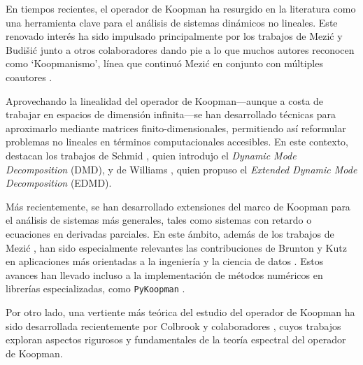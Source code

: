 En tiempos recientes, el operador de Koopman ha resurgido en la literatura como una herramienta clave para el análisis de sistemas dinámicos no lineales. Este renovado interés ha sido impulsado principalmente por los trabajos de Mezić y Budišić junto a otros colaboradores \cite{Budisic2009AnObservables, Budisic2012GeometryFlows, Budisic2012AppliedKoopmanism} dando pie a lo que muchos autores reconocen como `Koopmanismo', línea que continuó Mezić en conjunto con múltiples coautores \cite{Rowley2009SpectralFlows, Susuki2011NonlinearDynamics, Mezic2013AnalysisOperator, Mauroy2013IsostablesDynamics, Lan2013LinearizationSpectrum, Korda2018OnOperator, Korda2018LinearControl, Arbabi2017ErgodicOperator, Arbabi2017StudyDecomposition, Mauroy2020TheControl, Korda2020OptimalControl, Korda2020Data-drivenOperator, Mezic2020SpectrumGeometry, Mezic2022OnOperator, Mezic2024ACases}.  

Aprovechando la linealidad del operador de Koopman—aunque a costa de trabajar en espacios de dimensión infinita—se han desarrollado técnicas para aproximarlo mediante matrices finito-dimensionales, permitiendo así reformular problemas no lineales en términos computacionales accesibles. En este contexto, destacan los trabajos de Schmid \cite{Schmid2008DynamicData}, quien introdujo el \textit{Dynamic Mode Decomposition} (DMD), y de Williams \cite{Williams2015ADecomposition}, quien propuso el \textit{Extended Dynamic Mode Decomposition} (EDMD).  

Más recientemente, se han desarrollado extensiones del marco de Koopman para el análisis de sistemas más generales, tales como sistemas con retardo o ecuaciones en derivadas parciales. En este ámbito, además de los trabajos de Mezić \cite{Mezic2013AnalysisOperator, Mezic2020SpectrumGeometry, Mezic2022OnOperator}, han sido especialmente relevantes las contribuciones de Brunton y Kutz en aplicaciones más orientadas a la ingeniería y la ciencia de datos \cite{Tu2014OnApplications, Brunton2016KoopmanControl, Proctor2018GeneralizingControl, NathanKutz2018AppliedSystems, Lusch2018DeepDynamics, Brunton2019Data-DrivenControl, Kamb2020Time-delayApplications, Kaiser2021Data-drivenControl, Brunton2022ModernSystems, Baddoo2022KernelOptimization, Baddoo2023Physics-informedDecomposition}. Estos avances han llevado incluso a la implementación de métodos numéricos en librerías especializadas, como \texttt{PyKoopman} \cite{Pan2024PyKoopman:Operator}.  

Por otro lado, una vertiente más teórica del estudio del operador de Koopman ha sido desarrollada recientemente por Colbrook y colaboradores \cite{Colbrook2023ResidualKoopmanism, Colbrook2023THESYSTEMS, Colbrook2024TheAlgorithms, Colbrook2024RiggedOperators, Colbrook2024RigorousSystems, Colbrook2024LimitsLearning, Zagli2024BridgingResponse}, cuyos trabajos exploran aspectos rigurosos y fundamentales de la teoría espectral del operador de Koopman.  

